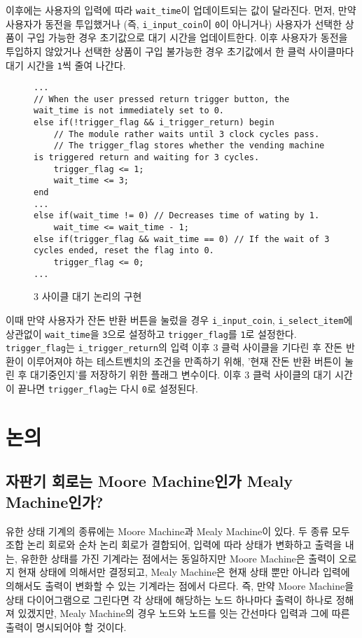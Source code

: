 \documentclass[openright, a4paper]{article}
\newcommand{\code}[1]{\texttt{#1}}
\begin{document}
이후에는 사용자의 입력에 따라 \code{wait_time}이 업데이트되는 값이 달라진다. 먼저, 만약 사용자가 동전을 투입했거나 
(즉, \code{i_input_coin}이 \code{0}이 아니거나) 사용자가 선택한 상품이 구입 가능한 경우 초기값으로 대기 시간을 업데이트한다.
이후 사용자가 동전을 투입하지 않았거나 선택한 상품이 구입 불가능한 경우 초기값에서 한 클럭 사이클마다 대기 시간을 \code{1}씩
줄여 나간다.

\hfill \break
\begin{figure}[h]
    \begin{verbatim}
...
// When the user pressed return trigger button, the wait_time is not immediately set to 0.
else if(!trigger_flag && i_trigger_return) begin
    // The module rather waits until 3 clock cycles pass.
    // The trigger_flag stores whether the vending machine is triggered return and waiting for 3 cycles.
    trigger_flag <= 1;
    wait_time <= 3;
end
...
else if(wait_time != 0) // Decreases time of wating by 1.
    wait_time <= wait_time - 1;
else if(trigger_flag && wait_time == 0) // If the wait of 3 cycles ended, reset the flag into 0.
    trigger_flag <= 0;
...
    \end{verbatim}
    \caption{3 사이클 대기 논리의 구현}
\end{figure}
\hfill \break

이때 만약 사용자가 잔돈 반환 버튼을 눌렀을 경우 \code{i_input_coin}, \code{i_select_item}에 상관없이 \code{wait_time}을 \code{3}으로
설정하고 \code{trigger_flag}를 \code{1}로 설정한다. \code{trigger_flag}는 \code{i_trigger_return}의 입력 이후 3 클럭 사이클을 기다린
후 잔돈 반환이 이루어져야 하는 테스트벤치의 조건을 만족하기 위해, '현재 잔돈 반환 버튼이 눌린 후 대기중인지'를 저장하기 위한
플래그 변수이다. 이후 3 클럭 사이클의 대기 시간이 끝나면 \code{trigger_flag}는 다시 \code{0}로 설정된다.

\section{논의}
\subsection{자판기 회로는 Moore Machine인가 Mealy Machine인가?}
유한 상태 기계의 종류에는 Moore Machine과 Mealy Machine이 있다. 두 종류 모두 조합 논리 회로와 순차 논리 회로가 결합되어, 입력에 따라
상태가 변화하고 출력을 내는, 유한한 상태를 가진 기계라는 점에서는 동일하지만 Moore Machine은 출력이 오로지 현재 상태에 의해서만 결정되고,
Mealy Machine은 현재 상태 뿐만 아니라 입력에 의해서도 출력이 변화할 수 있는 기계라는 점에서 다르다. 즉, 만약 Moore Machine을 상태 다이어그램으로
그린다면 각 상태에 해당하는 노드 하나마다 출력이 하나로 정해져 있겠지만, Mealy Machine의 경우 노드와 노드를 잇는 간선마다 입력과 그에 따른
출력이 명시되어야 할 것이다.
\end{document}
